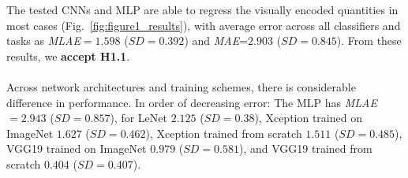 
 The tested CNNs and MLP are able to regress the visually encoded quantities in most cases (Fig.~\ref{fig:figure1_results}), with average error across all classifiers and tasks as \textit{MLAE}$=1.598$ ($SD=0.392$) and \textit{MAE}=$2.903$ ($SD=0.845$). 
From these results, we \textbf{accept H1.1}.
\\~\\
Across network architectures and training schemes, there is considerable difference in performance. In order of decreasing error: 
The MLP has \textit{MLAE}$=2.943$ ($SD=0.857$), 
for LeNet $2.125$ ($SD=0.38$), 
Xception trained on ImageNet $1.627$ ($SD=0.462$), 
Xception trained from scratch $1.511$ ($SD=0.485$),
VGG19 trained on ImageNet $0.979$ ($SD=0.581$), 
and VGG19 trained from scratch $0.404$ ($SD=0.407$).

